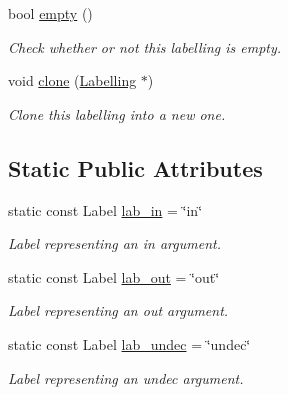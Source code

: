 \begin{DoxyCompactItemize}
bool \hyperlink{classLabelling_ac717b73662047c2ab68e0828ff3dc54e}{empty} ()
\begin{DoxyCompactList}\small\item\em Check whether or not this labelling is empty. \end{DoxyCompactList}\item 
void \hyperlink{classLabelling_a600661b61ebd7f0da5faea3fdef97b6c}{clone} (\hyperlink{classLabelling}{Labelling} $\ast$)
\begin{DoxyCompactList}\small\item\em Clone this labelling into a new one. \end{DoxyCompactList}\end{DoxyCompactItemize}
\subsection*{Static Public Attributes}
\begin{DoxyCompactItemize}
\item 
\hypertarget{classLabelling_aaf7f367dd2253b297cad3c622a0d2f49}{static const Label \hyperlink{classLabelling_aaf7f367dd2253b297cad3c622a0d2f49}{lab\-\_\-in} = \char`\"{}in\char`\"{}}\label{classLabelling_aaf7f367dd2253b297cad3c622a0d2f49}

\begin{DoxyCompactList}\small\item\em Label representing an {\ttfamily in} argument. \end{DoxyCompactList}\item 
\hypertarget{classLabelling_afed946f9be5cb9f3d60ca37e4baf45ba}{static const Label \hyperlink{classLabelling_afed946f9be5cb9f3d60ca37e4baf45ba}{lab\-\_\-out} = \char`\"{}out\char`\"{}}\label{classLabelling_afed946f9be5cb9f3d60ca37e4baf45ba}

\begin{DoxyCompactList}\small\item\em Label representing an {\ttfamily out} argument. \end{DoxyCompactList}\item 
\hypertarget{classLabelling_a4ae2c985855b2a4c084618b6493b0d92}{static const Label \hyperlink{classLabelling_a4ae2c985855b2a4c084618b6493b0d92}{lab\-\_\-undec} = \char`\"{}undec\char`\"{}}\label{classLabelling_a4ae2c985855b2a4c084618b6493b0d92}

\begin{DoxyCompactList}\small\item\em Label representing an {\ttfamily undec} argument. \end{DoxyCompactList}\end{DoxyCompactItemize}


